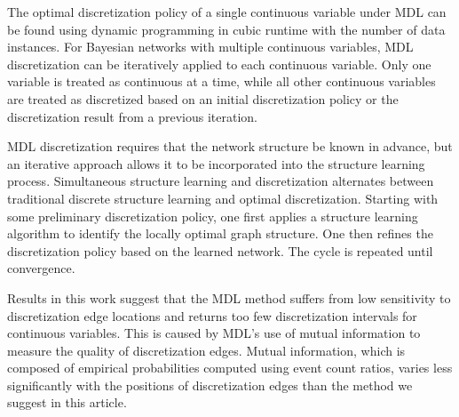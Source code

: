 The optimal discretization policy of a single continuous variable under MDL can be found using dynamic programming in cubic runtime with the number of data instances.
For Bayesian networks with multiple continuous variables, MDL discretization can be iteratively applied to each continuous variable.
Only one variable is treated as continuous at a time, while all other continuous variables are treated as discretized based on an initial discretization policy or the discretization result from a previous iteration.

MDL discretization requires that the network structure be known in advance, but an iterative approach allows it to be incorporated into the structure learning process.
Simultaneous structure learning and discretization alternates between traditional discrete structure learning and optimal discretization.
Starting with some preliminary discretization policy, one first applies a structure learning algorithm to identify the locally optimal graph structure.
One then refines the discretization policy based on the learned network.
The cycle is repeated until convergence.

Results in this work suggest that the MDL method suffers from low sensitivity to discretization edge locations and returns too few discretization intervals for continuous variables.
This is caused by MDL's use of mutual information to measure the quality of discretization edges.
Mutual information, which is composed of empirical probabilities computed using event count ratios, varies less significantly with the positions of discretization edges than the method we suggest in this article.





